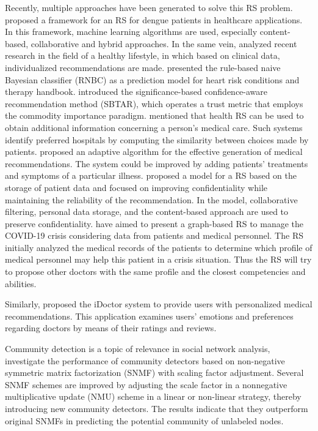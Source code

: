 \documentclass[sustainability,article,submit,pdftex,moreauthors]{Definitions/mdpi}
\begin{document}
Recently, multiple approaches have been generated to solve this RS problem. \citet{shaikh2022recommender} proposed a framework for an RS for dengue patients in healthcare applications. In this framework, machine learning algorithms are used, especially content-based, collaborative and hybrid approaches. In the same vein, \citet{vairale2019recommendation} analyzed recent research in the field of a healthy lifestyle, in which based on clinical data, individualized recommendations are made. \citet{fasidi2019rule} presented the rule-based naive Bayesian classifier (RNBC) as a prediction model for heart risk conditions and therapy handbook. \citet{gohari2020significance} introduced the significance-based confidence-aware recommendation method (SBTAR), which operates a trust metric that employs the commodity importance paradigm. \citet{sahoo2019intelligence} mentioned that health RS can be used to obtain additional information concerning a person's medical care. Such systems identify preferred hospitals by computing the similarity between choices made by patients. \citet{waqar2019adaptive} proposed an adaptive algorithm for the effective generation of medical recommendations. The system could be improved by adding patients' treatments and symptoms of a particular illness. \citet{mazeh2020personal} proposed a model for a RS based on the storage of patient data and focused on improving confidentiality while maintaining the reliability of the recommendation. In the model, collaborative filtering, personal data storage, and the content-based approach are used to preserve confidentiality. \citet{sayeb2022graph} have aimed to present a graph-based RS to manage the COVID-19 crisis considering data from patients and medical personnel. The RS initially analyzed the medical records of the patients to determine which profile of medical personnel may help this patient in a crisis situation. Thus the RS will try to propose other doctors with the same profile and the closest competencies and abilities. 

Similarly, \citet{zhang2017idoctor} proposed the iDoctor system to provide users with personalized medical recommendations. This application examines users' emotions and preferences regarding doctors by means of their ratings and reviews. 

Community detection is a topic of relevance in social network analysis, \citet{luo2021symmetric} investigate the performance of community detectors based on non-negative symmetric matrix factorization (SNMF) with scaling factor adjustment. Several SNMF schemes are improved by adjusting the scale factor in a nonnegative multiplicative update (NMU) scheme in a linear or non-linear strategy, thereby introducing new community detectors. The results indicate that they outperform original SNMFs in predicting the potential community of unlabeled nodes.
\end{document}
